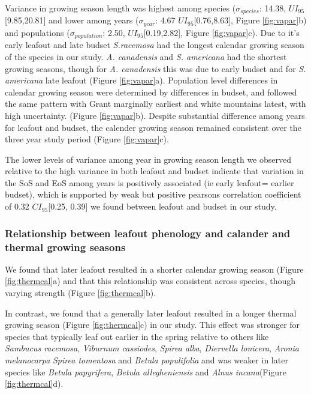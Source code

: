 \documentclass[12 pt]{article}
\begin{document}
Variance in growing season length was highest among species ($\sigma_{species}$: 14.38, $UI_{95}$[9.85,20.81] and lower among years ($\sigma_{year}$: 4.67 $UI_{95}$[0.76,8.63], Figure \ref{fig:vapar}b) and populations ($\sigma_{population}$: 2.50, $UI_{95}$[0.19,2.82], Figure \ref{fig:vapar}c). Due to it's early leafout and late budset \emph{S.racemosa} had the longest calendar growing season of the species in our study. \emph{A. canadensis} and \emph{S. americana} had the shortest growing seasons, though for \emph{A. canadensis} this was due to early budset and for \emph{S. americana} late leafout (Figure \ref{fig:vapar}a). Population level differences in calendar growing season were determined by differences in budset, and followed the same pattern with Grant marginally earliest and white mountains  latest, with high uncertainty. (Figure \ref{fig:vapar}b). Despite substantial difference among years for leafout and budset, the calender growing season remained consistent over the three year study period (Figure \ref{fig:vapar}c).

The lower levels of variance among year in growing season length we observed relative to the high variance in both leafout and budset indicate that variation in the SoS and EoS among years is positively associated (ie early leafout= earlier budset), which is supported by weak but positive pearsons correlation coefficient of 0.32 $CI_{95}$[0.25, 0.39] we found between leafout and budset in our study.

\subsubsection{Relationship between leafout phenology and calander and thermal growing seasons}

We found that later leafout resulted in a shorter calendar growing season (Figure \ref{fig:thermcal}a) and that this relationship was consistent across species, though varying strength  (Figure \ref{fig:thermcal}b).

In contrast, we found that a generally later leafout resulted in a longer thermal growing season (Figure \ref{fig:thermcal}c) in our study. This effect was stronger for species that typically leaf out earlier in the spring relative to others like \emph{Sambucus racemosa}, \emph{Viburnum cassiodes}, \emph{Spirea alba}, \emph{Diervella lonicera}, \emph{Aronia melanocarpa} \emph{Spirea tomentosa} and \emph{Betula populifolia} and was weaker in later species like \emph{Betula papyrifera}, \emph{Betula allegheniensis} and \emph{Alnus incana}(Figure \ref{fig:thermcal}d).
\end{document}
